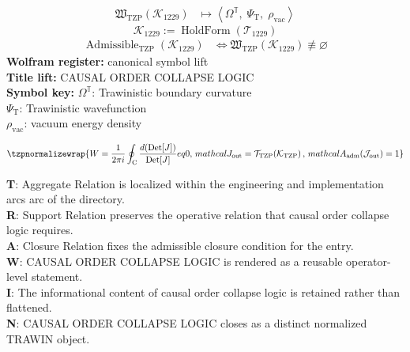 \noindent
\begin{minipage}[t]{0.48\linewidth}
\begingroup
\small
\[
\begin{aligned}
\mathfrak{W}_{\mathrm{TZP}}\!\left(\mathcal{K}_{1229}\right)
&\longmapsto
\left\langle \Omega^{\mathbb{T}},\; \Psi_{\mathrm{T}},\; \rho_{\mathrm{vac}} \right\rangle
\end{aligned}
\]
\[
\mathcal{K}_{1229}
:=
\operatorname{HoldForm}\!\left(\mathcal{T}_{1229}\right)
\]
\[
\begin{aligned}
\operatorname{Admissible}_{\mathrm{TZP}}\!\left(\mathcal{K}_{1229}\right)
&\Longleftrightarrow
\mathfrak{W}_{\mathrm{TZP}}\!\left(\mathcal{K}_{1229}\right)\not\equiv\varnothing
\end{aligned}
\]
\textbf{Wolfram register:} canonical symbol lift\\
\textbf{Title lift:} CAUSAL ORDER COLLAPSE LOGIC\\
\textbf{Symbol key:} \(\Omega^{\mathbb{T}}\): Trawinistic boundary curvature\\ \(\Psi_{\mathrm{T}}\): Trawinistic wavefunction\\ \(\rho_{\mathrm{vac}}\): vacuum energy density
\par
\endgroup
\end{minipage}\hfill
\begin{minipage}[t]{0.48\linewidth}
\[
\tzpnormalizewrap{W = \frac{1}{2\pi i} \oint_{\mathrm{C}} \frac{d(\text{Det}[J])}{{\rm Det}[J]}  eq 0,\,mathcal{J}_{\mathrm{out}} = \mathcal{T}_{\mathrm{TZP}}\!\left(\mathcal{K}_{\mathrm{TZP}}\right),\,mathcal{A}_{\mathrm{adm}}\!\left(\mathcal{J}_{\mathrm{out}}\right)=1}
\]

\small
\textbf{T}: Aggregate Relation is localized within the engineering and implementation arcs arc of the directory.\\
\textbf{R}: Support Relation preserves the operative relation that causal order collapse logic requires.\\
\textbf{A}: Closure Relation fixes the admissible closure condition for the entry.\\
\textbf{W}: CAUSAL ORDER COLLAPSE LOGIC is rendered as a reusable operator-level statement.\\
\textbf{I}: The informational content of causal order collapse logic is retained rather than flattened.\\
\textbf{N}: CAUSAL ORDER COLLAPSE LOGIC closes as a distinct normalized TRAWIN object.
\normalsize
\end{minipage}

